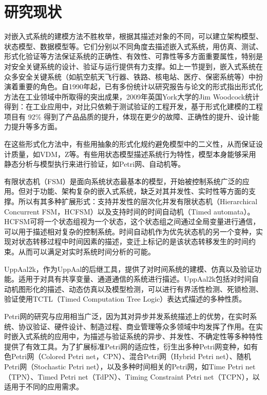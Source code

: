 \section{研究现状}

对嵌入式系统的建模方法不胜枚举，根据其描述对象的不同，可以建立架构模型、状态模型、数据模型等。它们分别以不同角度去描述嵌入式系统，用仿真、测试、形式化验证等方法保证系统的正确性、有效性、可靠性等多方面重要属性，特别是对安全关键系统的设计、验证与运行提供有力支撑。如上一节提到，嵌入式系统在众多安全关键系统（如航空航天飞行器、铁路、核电站、医疗、保密系统等）中扮演着重要的角色。自1990年起，已有多份统计以研究报告与论文的形式指出形式化方法在工业领域中所取得的突出成果，2009年英国York大学的Jim Woodcock统计得到：在工业应用中，对比只依赖于测试验证的工程开发，基于形式化建模的工程项目有 92\% 得到了产品品质的提升，体现在更少的故障、正确性的提升、设计能力提升等多方面。

在这些形式化方法中，有些用抽象的形式化规约避免模型中的二义性，从而保证设计质量，如VDM，Z等。有些用状态模型描述系统行为特性，模型本身能够采用静态分析与模型执行来进行验证，如Petri网、自动机等。

有限状态机（FSM）是面向系统状态最基本的模型，开始被控制系统广泛的应用。但对于功能、架构复杂的嵌入式系统，缺乏对其并发性、实时性等方面的支撑。所以有其多种扩展形式：支持并发性的层次化并发有限状态机（Hierarchical Concurrent FSM，HCFSM）以及支持时间的时间自动机（Timed automata）。HCFSM可将一个状态组视为一个状态，这个状态组之间通过全局变量进行通信，可以用于描述相对复杂的控制系统。时间自动机作为优先状态机的另一个变种，实现对状态转移过程中时间因素的描述，变迁上标记的是该状态转移发生的时间约束。从而可以满足对实时系统时间分析的可能。

UppAal2k，作为UppAal的后继工具，提供了对时间系统的建模、仿真以及验证功能。适用于对具有共享变量、通道通信的系统进行描述。UppAal2k包括对时间自动机图形化的描述、动态仿真以及模型检测，可以进行有界活性检测、死锁检测、验证使用TCTL（Timed Computation Tree Logic）表达式描述的多种性质。

Petri网的研究与应用相当广泛，因为其对异步并发系统描述上的优势，在实时系统、协议验证、硬件设计、制造过程、商业管理等众多领域中均发挥了作用。在实时嵌入式系统的应用中，为描述与验证系统的异步、并发性、不确定性等多种特性提供了有效工具。为了扩展标准Petri网的适应性，衍生出多种Petri网变种，如有色Petri网（Colored Petri net，CPN）、混合Petri网（Hybrid Petri net）、随机Petri网（Stochastic Petri net），以及多种时间相关的Petri网，如Time Petri net（TPN）、Timed Petri net（TdPN）、Timing Constraint Petri net（TCPN），以适用于不同的应用需求。


